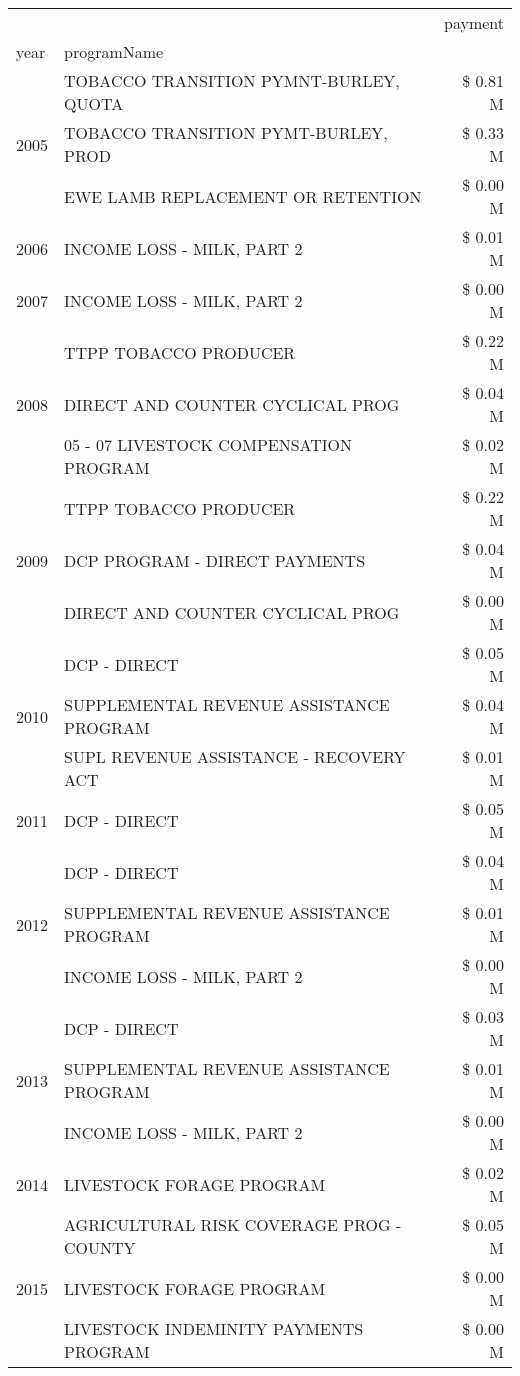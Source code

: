 \begin{tabular}{llr}
\toprule
 &  & payment \\
year & programName &  \\
\midrule
\multirow[t]{3}{*}{2005} & TOBACCO TRANSITION PYMNT-BURLEY, QUOTA & \$ 0.81 M \\
 & TOBACCO TRANSITION PYMT-BURLEY, PROD & \$ 0.33 M \\
 & EWE LAMB REPLACEMENT OR RETENTION & \$ 0.00 M \\
\cline{1-3}
2006 & INCOME LOSS - MILK, PART 2 & \$ 0.01 M \\
\cline{1-3}
2007 & INCOME LOSS - MILK, PART 2 & \$ 0.00 M \\
\cline{1-3}
\multirow[t]{3}{*}{2008} & TTPP TOBACCO PRODUCER & \$ 0.22 M \\
 & DIRECT AND COUNTER CYCLICAL PROG & \$ 0.04 M \\
 & 05 - 07 LIVESTOCK COMPENSATION PROGRAM & \$ 0.02 M \\
\cline{1-3}
\multirow[t]{3}{*}{2009} & TTPP TOBACCO PRODUCER & \$ 0.22 M \\
 & DCP PROGRAM - DIRECT PAYMENTS & \$ 0.04 M \\
 & DIRECT AND COUNTER CYCLICAL PROG & \$ 0.00 M \\
\cline{1-3}
\multirow[t]{3}{*}{2010} & DCP - DIRECT & \$ 0.05 M \\
 & SUPPLEMENTAL REVENUE ASSISTANCE PROGRAM & \$ 0.04 M \\
 & SUPL REVENUE ASSISTANCE - RECOVERY ACT & \$ 0.01 M \\
\cline{1-3}
2011 & DCP - DIRECT & \$ 0.05 M \\
\cline{1-3}
\multirow[t]{3}{*}{2012} & DCP - DIRECT & \$ 0.04 M \\
 & SUPPLEMENTAL REVENUE ASSISTANCE PROGRAM & \$ 0.01 M \\
 & INCOME LOSS - MILK, PART 2 & \$ 0.00 M \\
\cline{1-3}
\multirow[t]{3}{*}{2013} & DCP - DIRECT & \$ 0.03 M \\
 & SUPPLEMENTAL REVENUE ASSISTANCE PROGRAM & \$ 0.01 M \\
 & INCOME LOSS - MILK, PART 2 & \$ 0.00 M \\
\cline{1-3}
2014 & LIVESTOCK FORAGE PROGRAM & \$ 0.02 M \\
\cline{1-3}
\multirow[t]{3}{*}{2015} & AGRICULTURAL RISK COVERAGE PROG - COUNTY & \$ 0.05 M \\
 & LIVESTOCK FORAGE PROGRAM & \$ 0.00 M \\
 & LIVESTOCK INDEMINITY PAYMENTS PROGRAM & \$ 0.00 M \\

\end{tabular}
